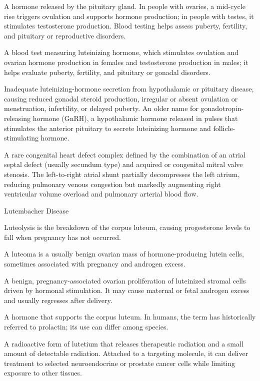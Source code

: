  A hormone released by the pituitary gland. In people with ovaries, a mid-cycle rise triggers ovulation and supports hormone production; in people with testes, it stimulates testosterone production. Blood testing helps assess puberty, fertility, and pituitary or reproductive disorders.

 A blood test measuring luteinizing hormone, which stimulates ovulation and ovarian hormone production in females and testosterone production in males; it helps evaluate puberty, fertility, and pituitary or gonadal disorders.

 Inadequate luteinizing-hormone secretion from hypothalamic or pituitary disease, causing reduced gonadal steroid production, irregular or absent ovulation or menstruation, infertility, or delayed puberty.
 An older name for gonadotropin-releasing hormone (GnRH), a hypothalamic hormone released in pulses that stimulates the anterior pituitary to secrete luteinizing hormone and follicle-stimulating hormone.

 A rare congenital heart defect complex defined by the combination of an atrial septal defect (usually secundum type) and acquired or congenital mitral valve stenosis. The left-to-right atrial shunt partially decompresses the left atrium, reducing pulmonary venous congestion but markedly augmenting right ventricular volume overload and pulmonary arterial blood flow.

\synonyms
Lutembacher Disease

 Luteolysis is the breakdown of the corpus luteum, causing progesterone levels to fall when pregnancy has not occurred.

 A luteoma is a usually benign ovarian mass of hormone-producing lutein cells, sometimes associated with pregnancy and androgen excess.

 A benign, pregnancy-associated ovarian proliferation of luteinized stromal cells driven by hormonal stimulation. It may cause maternal or fetal androgen excess and usually regresses after delivery.

 A hormone that supports the corpus luteum. In humans, the term has historically referred to prolactin; its use can differ among species.

 A radioactive form of lutetium that releases therapeutic radiation and a small amount of detectable radiation. Attached to a targeting molecule, it can deliver treatment to selected neuroendocrine or prostate cancer cells while limiting exposure to other tissues.

